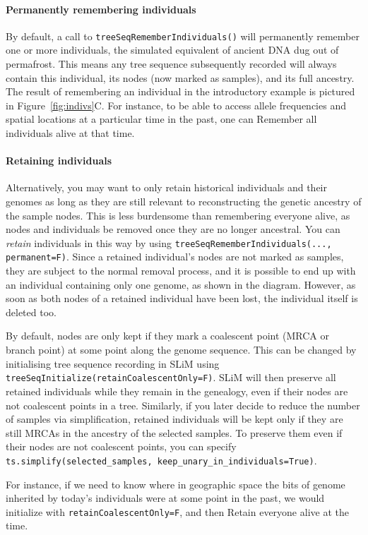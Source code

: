 \documentclass[12pt]{article}
\begin{document}
\paragraph{Permanently remembering individuals}
By default, a call to \verb|treeSeqRememberIndividuals()|
will permanently remember one or more individuals,
the simulated equivalent of ancient DNA dug out of permafrost.
This means any tree sequence subsequently recorded will always contain this individual,
its nodes (now marked as samples), and its full ancestry.
The result of remembering an individual in the introductory example is pictured
in Figure~\ref{fig:indivs}C.
For instance, to be able to access allele frequencies and spatial locations
at a particular time in the past,
one can Remember all individuals alive at that time.

\paragraph{Retaining individuals}
Alternatively, you may want to only
retain historical individuals and their genomes
as long as they are still relevant to reconstructing the genetic ancestry of the sample nodes.
This is less burdensome than remembering everyone alive,
as nodes and individuals be removed once they are no longer ancestral.
You can \emph{retain} individuals in this way by using
\verb|treeSeqRememberIndividuals(..., permanent=F)|.
Since a retained individual’s nodes are not marked as samples,
they are subject to the normal removal process,
and it is possible to end up with an individual containing only one genome, as shown in the diagram.
However, as soon as both nodes of a retained individual have been lost,
the individual itself is deleted too.

By default, nodes are only kept if they mark a coalescent point (MRCA or branch point)
at some point along the genome sequence.
This can be changed by initialising tree sequence recording in SLiM using
\verb|treeSeqInitialize(retainCoalescentOnly=F)|.
SLiM will then preserve all retained individuals while they remain in the genealogy,
even if their nodes are not coalescent points in a tree.
Similarly, if you later decide to reduce the number of samples via simplification,
retained individuals will be kept only if they are still MRCAs
in the ancestry of the selected samples.
To preserve them even if their nodes are not coalescent points,
you can specify
\verb|ts.simplify(selected_samples, keep_unary_in_individuals=True)|.

For instance, if we need to know where in geographic space
the bits of genome inherited by today's individuals were at some point in the past,
we would initialize with \verb|retainCoalescentOnly=F|,
and then Retain everyone alive at the time.
\end{document}

